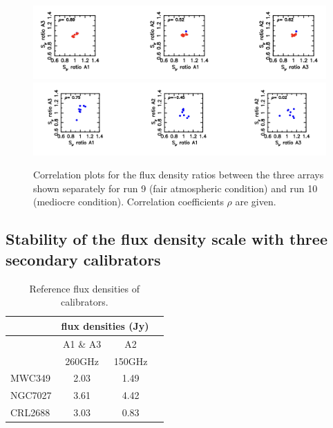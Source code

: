 \begin{figure}
  \includegraphics[clip, angle=0, scale=0.55]{Figures/Corr_r9.png}
  \includegraphics[clip, angle=0, scale=0.55]{Figures/Corr_r10.png}  
  \caption{Correlation plots for the flux density ratios between  the three arrays
    shown separately for run 9 (fair atmospheric condition) and run 10 (mediocre condition).
    Correlation coefficients $\rho$ are given.}
\label{fig:U_N_corr}
\end{figure}

\subsection{Stability of the flux density scale with three secondary calibrators }

\begin{table}
\centering
\label{tab:fluxPred}
\caption[]{Reference flux densities of calibrators.}
\begin{tabular}{|l|c|c|c|}
\hline
\multicolumn{1}{|c}{}  & \multicolumn{2}{|c|}{flux  densities (Jy)}  \\
\hline
         &    A1 \& A3  &  A2     \\
         &  260GHz    & 150GHz   \\
\hline
MWC349   &   2.03    &  1.49    \\
NGC7027  &   3.61   &  4.42   \\
CRL2688  &   3.03   &  0.83  \\
\hline
\end{tabular}
\label{tab:flux_cal_sec}
\end{table}

